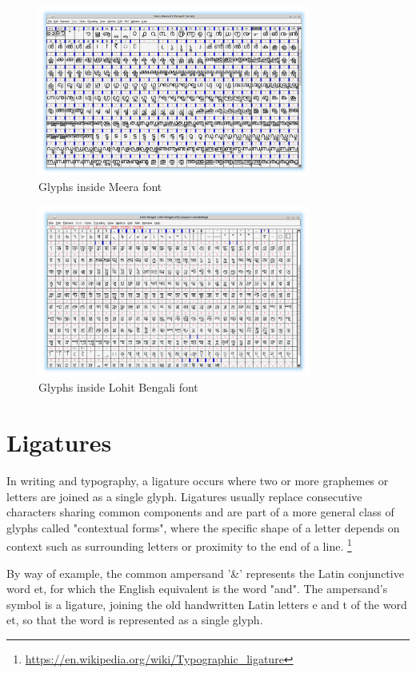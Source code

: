 \begin{figure}[h]
    \centering
    \includegraphics[width=0.8\textwidth]{glyph-fontforge-meera.png}
    \caption{Glyphs inside Meera font}
\end{figure}

\begin{figure}[h]
    \centering
    \includegraphics[width=0.8\textwidth]{glyph-fontforge-lohit-bengali.png}
    \caption{Glyphs inside Lohit Bengali font}
\end{figure}

\section{Ligatures }

In writing and typography, a ligature occurs where two or more graphemes or letters are joined as a single glyph. Ligatures usually replace consecutive characters sharing common components and are part of a more general class of glyphs called "contextual forms", where the specific shape of a letter depends on context such as surrounding letters or proximity to the end of a line.
\footnote{\url{https://en.wikipedia.org/wiki/Typographic_ligature}}

By way of example, the common ampersand '\&' represents the Latin conjunctive word et, for which the English equivalent is the word "and". The ampersand's symbol is a ligature, joining the old handwritten Latin letters e and t of the word et, so that the word is represented as a single glyph.

